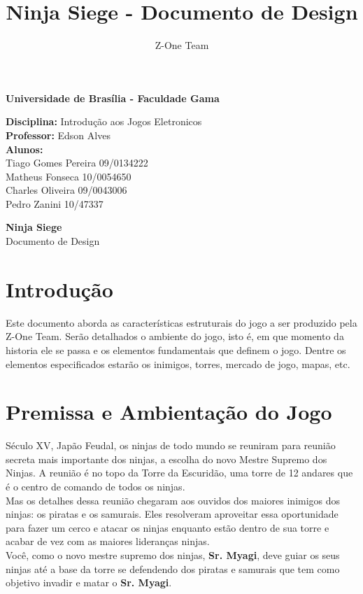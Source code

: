\documentclass[12pt,a4paper]{article}
\author{Z-One Team}
\title{Ninja Siege - Documento de Design}
\begin{document}
\begin{center}\textbf{Universidade de Brasília - Faculdade Gama}\end{center}

\textbf{Disciplina:} Introdução aos Jogos Eletronicos\\
\textbf{Professor:} Edson Alves\\
\textbf{Alunos:}\\
Tiago Gomes Pereira 09/0134222\\
Matheus Fonseca 10/0054650\\
Charles Oliveira 09/0043006\\
Pedro Zanini 10/47337\\

\begin{center}
\huge{\textbf{Ninja Siege}}\\
Documento de Design\\
\end{center}

\newpage
\tableofcontents

\newpage
\section{Introdução}
	Este documento aborda as características estruturais do jogo a ser produzido pela Z-One Team. Serão detalhados o ambiente do jogo, isto é, em que momento da historia ele se passa e os elementos fundamentais que definem o jogo. Dentre os elementos especificados estarão os inimigos, torres, mercado de jogo, mapas, etc.\\

\section{Premissa e Ambientação do Jogo}
	Século XV, Japão Feudal, os ninjas de todo mundo se reuniram para reunião secreta mais importante dos ninjas, a escolha do novo Mestre Supremo dos Ninjas. A reunião é no topo da Torre da Escuridão, uma torre de 12 andares que é o centro de comando de todos os ninjas.\\
	Mas os detalhes dessa reunião chegaram aos ouvidos dos maiores inimigos dos ninjas: os piratas e os samurais. Eles resolveram aproveitar essa oportunidade para fazer um cerco e atacar os ninjas enquanto estão dentro de sua torre e acabar de vez com as maiores lideranças ninjas.\\
    Você, como o novo mestre supremo dos ninjas, \textbf{Sr. Myagi}, deve guiar os seus ninjas até a base da torre se defendendo dos piratas e samurais que tem como objetivo invadir e matar o \textbf{Sr. Myagi}.\\
\end{document}
